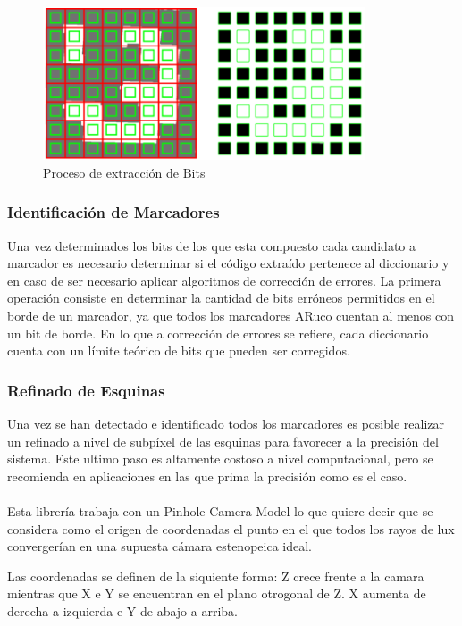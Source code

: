 \begin{figure}[hp!]
  \centering
  \includegraphics[width=0.85\textwidth]{imaxes/marker_bits_extraction.png}
  \caption{Proceso de extracción de Bits}
  \label{fig:mbe}
\end{figure}

\subsubsection*{Identificación de Marcadores}
Una vez determinados los bits de los que esta compuesto cada candidato a marcador es necesario determinar si el código extraído pertenece al diccionario y en caso de ser necesario aplicar algoritmos de corrección de errores.
La primera operación consiste en determinar la cantidad de bits erróneos permitidos en el borde de un marcador, ya que todos los marcadores ARuco cuentan al menos con un bit de borde. En lo que a corrección de errores se refiere, cada diccionario cuenta con un límite teórico de bits que pueden ser corregidos.

\subsubsection*{Refinado de Esquinas}
Una vez se han detectado e identificado todos los marcadores es posible realizar  un refinado a nivel de subpíxel de las esquinas para favorecer a la precisión del sistema. Este ultimo paso es altamente costoso a nivel computacional, pero se recomienda en aplicaciones en las que prima la precisión como es el caso.
\paragraph{}
Esta librería trabaja con un Pinhole Camera Model lo que quiere decir que se considera como el origen de coordenadas el punto en el que todos los rayos de lux convergerían en una supuesta cámara estenopeica ideal.

Las coordenadas se definen de la siquiente forma: Z crece frente a la camara mientras que X e Y se encuentran en el plano otrogonal de Z. X aumenta de derecha a izquierda e Y de abajo a arriba.




